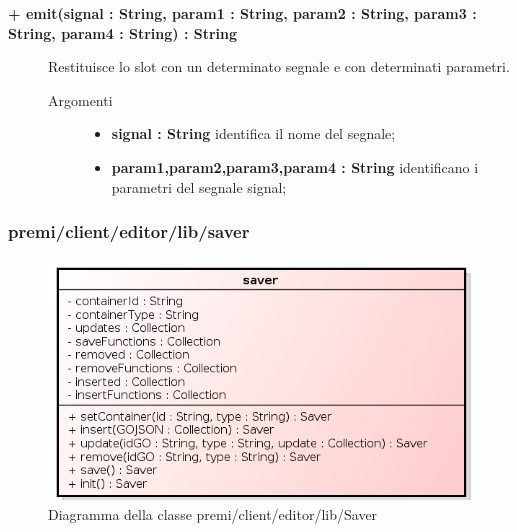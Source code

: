 \begin{description}
	\begin{description}
		\item[\textbf{\color{blue}+ emit(signal : String, param1 : String, param2 : String, param3 : String, param4 : String) : String			}] \hfill
			Restituisce lo slot con un determinato segnale e con determinati parametri.
			
		\begin{description}
			\item[Argomenti] \hfill
				\begin{itemize}
				
					\item \textbf{signal : String			} \hfill
					identifica il nome del segnale;
					\item \textbf{param1,param2,param3,param4 : String			} \hfill
					identificano i parametri del segnale signal;			
				\end{itemize}
		\end{description}
	\end{description}		
	
	
\end{description}

\subsubsection{premi/client/editor/lib/saver}
\begin{figure}[H]
\begin{center}
\includegraphics[scale=0.90]{img/diacla/Saver.png}
\caption{Diagramma della classe premi/client/editor/lib/Saver}
\end{center}
\end{figure} 
 
